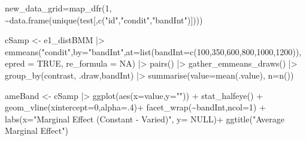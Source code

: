 \documentclass[
  letterpaper,
  DIV=11,
  numbers=noendperiod]{scrartcl}
\newenvironment{Shaded}{\begin{snugshade}}{\end{snugshade}}
\newcommand{\AttributeTok}[1]{\textcolor[rgb]{0.40,0.45,0.13}{#1}}
\newcommand{\ConstantTok}[1]{\textcolor[rgb]{0.56,0.35,0.01}{#1}}
\newcommand{\DecValTok}[1]{\textcolor[rgb]{0.68,0.00,0.00}{#1}}
\newcommand{\FunctionTok}[1]{\textcolor[rgb]{0.28,0.35,0.67}{#1}}
\newcommand{\NormalTok}[1]{\textcolor[rgb]{0.00,0.23,0.31}{#1}}
\newcommand{\OtherTok}[1]{\textcolor[rgb]{0.00,0.23,0.31}{#1}}
\newcommand{\SpecialCharTok}[1]{\textcolor[rgb]{0.37,0.37,0.37}{#1}}
\newcommand{\StringTok}[1]{\textcolor[rgb]{0.13,0.47,0.30}{#1}}
\begin{document}
\begin{Shaded}
\begin{Highlighting}[]
\NormalTok{new\_data\_grid}\OtherTok{=}\FunctionTok{map\_dfr}\NormalTok{(}\DecValTok{1}\NormalTok{, }\SpecialCharTok{\textasciitilde{}}\FunctionTok{data.frame}\NormalTok{(}\FunctionTok{unique}\NormalTok{(test[,}\FunctionTok{c}\NormalTok{(}\StringTok{"id"}\NormalTok{,}\StringTok{"condit"}\NormalTok{,}\StringTok{"bandInt"}\NormalTok{)])))}

\NormalTok{cSamp }\OtherTok{\textless{}{-}}\NormalTok{ e1\_distBMM  }\SpecialCharTok{|\textgreater{}} 
  \FunctionTok{emmeans}\NormalTok{(}\StringTok{"condit"}\NormalTok{,}\AttributeTok{by=}\StringTok{"bandInt"}\NormalTok{,}\AttributeTok{at=}\FunctionTok{list}\NormalTok{(}\AttributeTok{bandInt=}\FunctionTok{c}\NormalTok{(}\DecValTok{100}\NormalTok{,}\DecValTok{350}\NormalTok{,}\DecValTok{600}\NormalTok{,}\DecValTok{800}\NormalTok{,}\DecValTok{1000}\NormalTok{,}\DecValTok{1200}\NormalTok{)),}
          \AttributeTok{epred =} \ConstantTok{TRUE}\NormalTok{, }\AttributeTok{re\_formula =} \ConstantTok{NA}\NormalTok{) }\SpecialCharTok{|\textgreater{}} 
  \FunctionTok{pairs}\NormalTok{() }\SpecialCharTok{|\textgreater{}} \FunctionTok{gather\_emmeans\_draws}\NormalTok{()  }\SpecialCharTok{|\textgreater{}}
  \FunctionTok{group\_by}\NormalTok{(contrast, .draw,bandInt) }\SpecialCharTok{|\textgreater{}} \FunctionTok{summarise}\NormalTok{(}\AttributeTok{value=}\FunctionTok{mean}\NormalTok{(.value), }\AttributeTok{n=}\FunctionTok{n}\NormalTok{())}


\NormalTok{ ameBand }\OtherTok{\textless{}{-}}\NormalTok{ cSamp }\SpecialCharTok{|\textgreater{}} \FunctionTok{ggplot}\NormalTok{(}\FunctionTok{aes}\NormalTok{(}\AttributeTok{x=}\NormalTok{value,}\AttributeTok{y=}\StringTok{""}\NormalTok{)) }\SpecialCharTok{+} 
  \FunctionTok{stat\_halfeye}\NormalTok{() }\SpecialCharTok{+} 
  \FunctionTok{geom\_vline}\NormalTok{(}\AttributeTok{xintercept=}\DecValTok{0}\NormalTok{,}\AttributeTok{alpha=}\NormalTok{.}\DecValTok{4}\NormalTok{)}\SpecialCharTok{+}
  \FunctionTok{facet\_wrap}\NormalTok{(}\SpecialCharTok{\textasciitilde{}}\NormalTok{bandInt,}\AttributeTok{ncol=}\DecValTok{1}\NormalTok{) }\SpecialCharTok{+} \FunctionTok{labs}\NormalTok{(}\AttributeTok{x=}\StringTok{"Marginal Effect (Constant {-} Varied)"}\NormalTok{, }\AttributeTok{y=} \ConstantTok{NULL}\NormalTok{)}\SpecialCharTok{+}
  \FunctionTok{ggtitle}\NormalTok{(}\StringTok{"Average Marginal Effect"}\NormalTok{)}


\end{Highlighting}
\end{Shaded}
\end{document}
